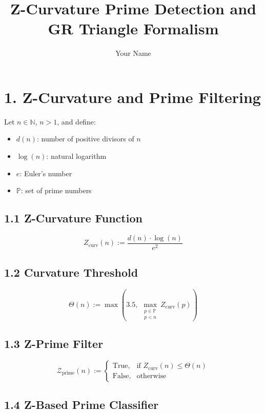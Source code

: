 \documentclass{article}
\title{Z-Curvature Prime Detection and GR Triangle Formalism}
\author{Your Name}
\date{}
\begin{document}
\maketitle

\section*{1. Z-Curvature and Prime Filtering}

Let \( n \in \mathbb{N} \), \( n > 1 \), and define:

\begin{itemize}
    \item \( d(n) \): number of positive divisors of \( n \)
    \item \( \log(n) \): natural logarithm
    \item \( e \): Euler’s number
    \item \( \mathbb{P} \): set of prime numbers
\end{itemize}

\subsection*{1.1 Z-Curvature Function}

\[
Z_{\text{curv}}(n) := \frac{d(n) \cdot \log(n)}{e^2}
\]

\subsection*{1.2 Curvature Threshold}

\[
\Theta(n) := \max \left( 3.5,\ \max_{\substack{p \in \mathbb{P} \\ p < n}} Z_{\text{curv}}(p) \right)
\]

\subsection*{1.3 Z-Prime Filter}

\[
\mathcal{Z}_\text{prime}(n) := 
\begin{cases}
\text{True}, & \text{if } Z_{\text{curv}}(n) \leq \Theta(n) \\
\text{False}, & \text{otherwise}
\end{cases}
\]

\subsection*{1.4 Z-Based Prime Classifier}
\end{document}
